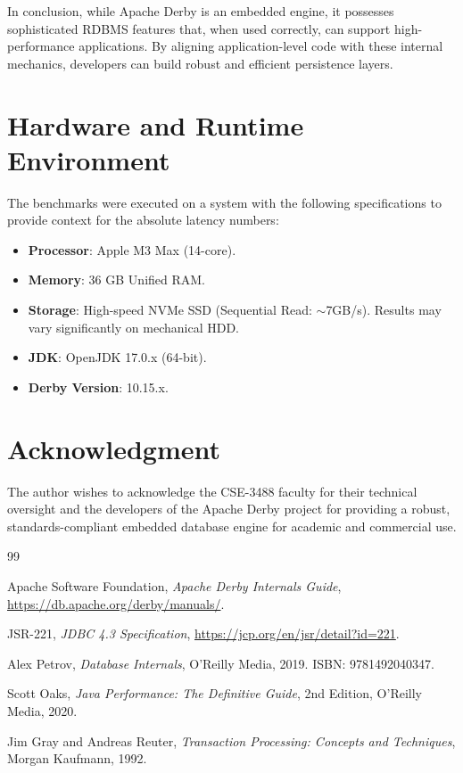 \documentclass[journal]{IEEEtran}
\begin{document}
In conclusion, while Apache Derby is an embedded engine, it possesses sophisticated RDBMS features that, when used correctly, can support high-performance applications. By aligning application-level code with these internal mechanics, developers can build robust and efficient persistence layers.

\appendices
\section{Hardware and Runtime Environment}
The benchmarks were executed on a system with the following specifications to provide context for the absolute latency numbers:
\begin{itemize}
    \item \textbf{Processor}: Apple M3 Max (14-core).
    \item \textbf{Memory}: 36 GB Unified RAM.
    \item \textbf{Storage}: High-speed NVMe SSD (Sequential Read: $\sim$7GB/s). Results may vary significantly on mechanical HDD.
    \item \textbf{JDK}: OpenJDK 17.0.x (64-bit).
    \item \textbf{Derby Version}: 10.15.x.
\end{itemize}

\section*{Acknowledgment}
The author wishes to acknowledge the CSE-3488 faculty for their technical oversight and the developers of the Apache Derby project for providing a robust, standards-compliant embedded database engine for academic and commercial use.

\begin{thebibliography}{99}

Apache Software Foundation, \emph{Apache Derby Internals Guide}, \url{https://db.apache.org/derby/manuals/}.

JSR-221, \emph{JDBC 4.3 Specification}, \url{https://jcp.org/en/jsr/detail?id=221}.

Alex Petrov, \emph{Database Internals}, O'Reilly Media, 2019. ISBN: 9781492040347.

Scott Oaks, \emph{Java Performance: The Definitive Guide}, 2nd Edition, O'Reilly Media, 2020.

Jim Gray and Andreas Reuter, \emph{Transaction Processing: Concepts and Techniques}, Morgan Kaufmann, 1992.

\end{thebibliography}
\end{document}
